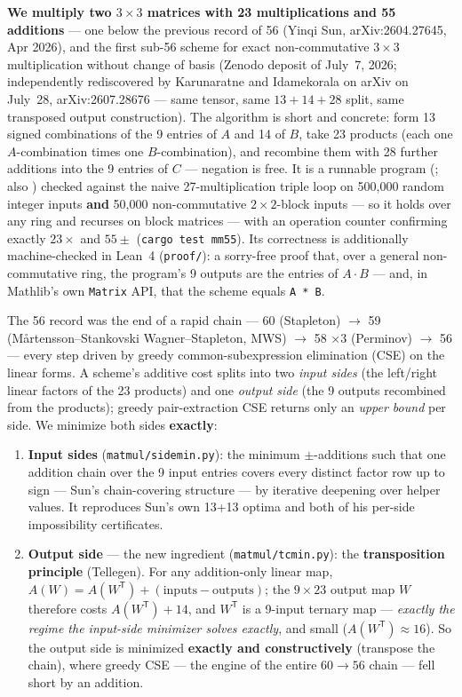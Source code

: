 \documentclass[10pt]{article}
\newcommand{\WT}{\ensuremath{W^{\mathsf T}}}
\begin{document}
\textbf{We multiply two $3\times 3$ matrices with 23 multiplications
and 55 additions} --- one below the previous record of 56 (Yinqi Sun,
arXiv:2604.27645, Apr 2026), and the first sub-56 scheme for exact
non-commutative $3\times3$ multiplication without change of basis
(Zenodo deposit of July~7, 2026; independently rediscovered by
Karunaratne and Idamekorala on arXiv on July~28, arXiv:2607.28676 ---
same tensor, same $13{+}14{+}28$ split, same transposed output
construction). The algorithm is short and concrete: form 13 signed combinations of the 9
entries of $A$ and 14 of $B$, take 23 products (each one
$A$-combination times one $B$-combination), and recombine them with 28
further additions into the 9 entries of $C$ --- negation is free. It is
a runnable program (; also
) checked against the naive
27-multiplication triple loop on 500{,}000 random integer inputs
\textbf{and} 50{,}000 non-commutative $2\times2$-block inputs --- so it
holds over any ring and recurses on block matrices --- with an
operation counter confirming exactly $23\times$ and $55\pm$
(\texttt{cargo test mm55}). Its correctness is additionally
machine-checked in Lean~4 (\texttt{proof/}): a sorry-free
proof that, over a general non-commutative ring, the program's 9
outputs are the entries of $A\cdot B$ --- and, in Mathlib's own
\texttt{Matrix} API, that the scheme equals \texttt{A * B}.

The 56 record was the end of a rapid chain --- 60 (Stapleton) $\to$ 59
(M\aa rtensson--Stankovski Wagner--Stapleton, MWS) $\to$ 58 $\times 3$
(Perminov) $\to$ 56 --- every step driven by greedy
common-subexpression elimination (CSE) on the linear forms. A scheme's
additive cost splits into two \emph{input sides} (the left/right
linear factors of the 23 products) and one \emph{output side} (the 9
outputs recombined from the products); greedy pair-extraction CSE
returns only an \emph{upper bound} per side. We minimize both sides
\textbf{exactly}:

\begin{enumerate}[itemsep=2pt]
\item \textbf{Input sides} (\texttt{matmul/sidemin.py}): the minimum
  $\pm$-additions such that one addition chain over the 9 input entries
  covers every distinct factor row up to sign --- Sun's chain-covering
  structure --- by iterative deepening over helper values. It
  reproduces Sun's own 13+13 optima and both of his per-side
  impossibility certificates.
\item \textbf{Output side} --- the new ingredient
  (\texttt{matmul/tcmin.py}): the \textbf{transposition principle}
  (Tellegen). For any addition-only linear map, $A(W) = A(\WT) +
  (\mathrm{inputs} - \mathrm{outputs})$; the $9\times23$ output map $W$
  therefore costs $A(\WT) + 14$, and \WT{} is a 9-input ternary map ---
  \emph{exactly the regime the input-side minimizer solves exactly},
  and small ($A(\WT) \approx 16$). So the output side is minimized
  \textbf{exactly and constructively} (transpose the chain), where
  greedy CSE --- the engine of the entire $60\to56$ chain --- fell
  short by an addition.
\end{enumerate}
\end{document}
